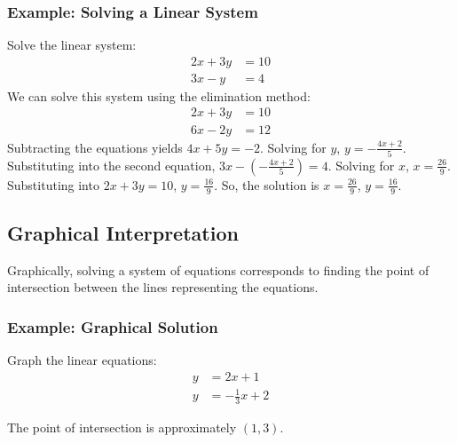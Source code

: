 \documentclass{article}
\begin{document}
\subsubsection{Example: Solving a Linear System}
Solve the linear system:
\begin{align*}
    2x + 3y &= 10 \\
    3x - y &= 4
\end{align*}
We can solve this system using the elimination method:
\begin{align*}
    2x + 3y &= 10 \\
    6x - 2y &= 12
\end{align*}
Subtracting the equations yields $4x + 5y = -2$. Solving for $y$, $y = -\frac{4x + 2}{5}$. Substituting into the second equation, $3x - \left(-\frac{4x + 2}{5}\right) = 4$. Solving for $x$, $x = \frac{26}{9}$. Substituting into $2x + 3y = 10$, $y = \frac{16}{9}$. So, the solution is $x = \frac{26}{9}$, $y = \frac{16}{9}$.

\subsection{Graphical Interpretation}
Graphically, solving a system of equations corresponds to finding the point of intersection between the lines representing the equations.

\subsubsection{Example: Graphical Solution}
Graph the linear equations:
\begin{align*}
    y &= 2x + 1 \\
    y &= -\frac{1}{3}x + 2
\end{align*}
\begin{center}
\end{center}
The point of intersection is approximately $(1, 3)$.
\end{document}
